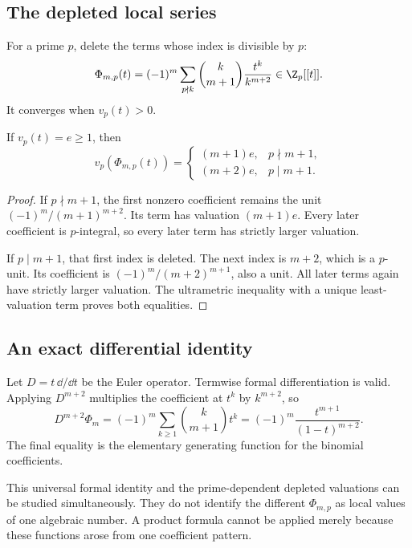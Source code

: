 \subsection{The depleted local series}
For a prime $p$, delete the terms whose index is divisible by $p$:
\[
 \Phi_{m,p}(t)=(-1)^m\sum_{p\nmid k}\binom{k}{m+1}\frac{t^k}{k^{m+2}}\in\Z_p[[t]].
\]
It converges when $v_p(t)>0$.
\begin{theorem}
If $v_p(t)=e\ge1$, then
\[
 v_p(\Phi_{m,p}(t))=
 \begin{cases}
 (m+1)e,&p\nmid m+1,\\
 (m+2)e,&p\mid m+1.
 \end{cases}
\]
\end{theorem}
\begin{proof}
If $p\nmid m+1$, the first nonzero coefficient remains the unit $(-1)^m/(m+1)^{m+2}$. Its term has valuation $(m+1)e$. Every later coefficient is $p$-integral, so every later term has strictly larger valuation.

If $p\mid m+1$, that first index is deleted. The next index is $m+2$, which is a $p$-unit. Its coefficient is $(-1)^m/(m+2)^{m+1}$, also a unit. All later terms again have strictly larger valuation. The ultrametric inequality with a unique least-valuation term proves both equalities.
\end{proof}

\subsection{An exact differential identity}
Let $D=t\,\dd/\dd t$ be the Euler operator. Termwise formal differentiation is valid. Applying $D^{m+2}$ multiplies the coefficient at $t^k$ by $k^{m+2}$, so
\[
 D^{m+2}\Phi_m=(-1)^m\sum_{k\ge1}\binom{k}{m+1}t^k
 =(-1)^m\frac{t^{m+1}}{(1-t)^{m+2}}.
\]
The final equality is the elementary generating function for the binomial coefficients.

This universal formal identity and the prime-dependent depleted valuations can be studied simultaneously. They do not identify the different $\Phi_{m,p}$ as local values of one algebraic number. A product formula cannot be applied merely because these functions arose from one coefficient pattern.
